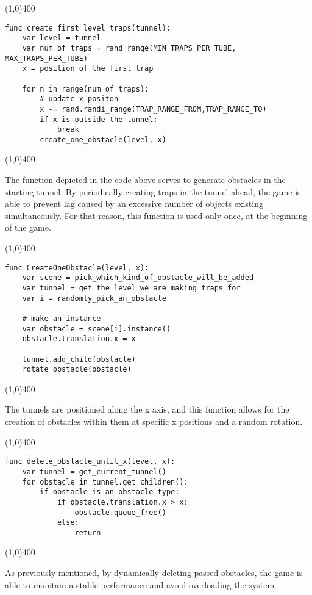 \begin{center}
\line(1,0){400}
\begin{lstlisting}
func create_first_level_traps(tunnel):
	var level = tunnel
	var num_of_traps = rand_range(MIN_TRAPS_PER_TUBE, MAX_TRAPS_PER_TUBE)
	x = position of the first trap
	
	for n in range(num_of_traps):
		# update x positon
		x -= rand.randi_range(TRAP_RANGE_FROM,TRAP_RANGE_TO)
		if x is outside the tunnel:
			break
		create_one_obstacle(level, x)
\end{lstlisting}
\line(1,0){400}
\end{center}

The function depicted in the code above serves to generate obstacles in the starting tunnel. By periodically creating traps in the tunnel ahead, the game is able to prevent lag caused by an excessive number of objects existing simultaneously. For that reason, this function is used only once, at the beginning of the game.

\begin{center}
\line(1,0){400}
\begin{lstlisting}
func CreateOneObstacle(level, x):
	var scene = pick_which_kind_of_obstacle_will_be_added
	var tunnel = get_the_level_we_are_making_traps_for
	var i = randomly_pick_an_obstacle
	
	# make an instance
	var obstacle = scene[i].instance()
	obstacle.translation.x = x
	
	tunnel.add_child(obstacle)
    rotate_obstacle(obstacle)
\end{lstlisting}
\line(1,0){400}
\end{center}

The tunnels are positioned along the x axis, and this function allows for the creation of obstacles within them at specific x positions and a random rotation.

\begin{center}
\line(1,0){400}
\begin{lstlisting}
func delete_obstacle_until_x(level, x):
	var tunnel = get_current_tunnel()
	for obstacle in tunnel.get_children():
		if obstacle is an obstacle type:
			if obstacle.translation.x > x:
				obstacle.queue_free()
			else:
				return
\end{lstlisting}
\line(1,0){400}
\end{center}

As previously mentioned, by dynamically deleting passed obstacles, the game is able to maintain a stable performance and avoid overloading the system.